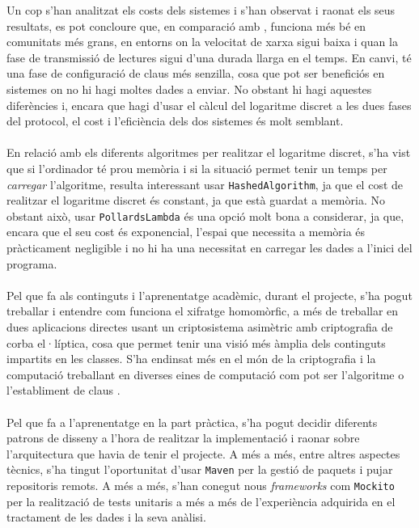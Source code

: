 
Un cop s'han analitzat els costs dels sistemes i s'han observat i raonat els seus resultats, es pot concloure que, en comparació amb \cite{busom}, \cite{recsi} funciona més bé en comunitats més grans, en entorns on la velocitat de xarxa sigui baixa i quan la fase de transmissió de lectures sigui d'una durada llarga en el temps. En canvi, \cite{busom} té una fase de configuració de claus més senzilla, cosa que pot ser beneficiós en sistemes on no hi hagi moltes dades a enviar. No obstant hi hagi aquestes diferències i, encara que \cite{recsi} hagi d'usar el càlcul del logaritme discret a les dues fases del protocol, el cost i l'eficiència dels dos sistemes és molt semblant.
\\
\\
En relació amb els diferents algoritmes per realitzar el logaritme discret, s'ha vist que si l'ordinador té prou memòria i si la situació permet tenir un temps per \textit{carregar} l'algoritme, resulta interessant usar \texttt{HashedAlgorithm}, ja que el cost de realitzar el logaritme discret és constant, ja que està guardat a memòria. No obstant això, usar \texttt{PollardsLambda} és una opció molt bona a considerar, ja que, encara que el seu cost és exponencial, l'espai que necessita a memòria és pràcticament negligible i no hi ha una necessitat en carregar les dades a l'inici del programa.
\\
\\
Pel que fa als continguts i l'aprenentatge acadèmic, durant el projecte, s'ha pogut treballar i entendre com funciona el xifratge homomòrfic, a més de treballar en dues aplicacions directes usant un criptosistema asimètric amb criptografia de corba el·líptica, cosa que permet tenir una visió més àmplia dels continguts impartits en les classes. S'ha endinsat més en el món de la criptografia i la computació treballant en diverses eines de computació com pot ser l'algoritme \cite{kangaroo} o l'establiment de claus \cite{diffie-hellman}.
\\
\\
Pel que fa a l'aprenentatge en la part pràctica, s'ha pogut decidir diferents patrons de disseny a l'hora de realitzar la implementació i raonar sobre l'arquitectura que havia de tenir el projecte. A més a més, entre altres aspectes tècnics, s'ha tingut l'oportunitat d'usar \texttt{Maven} per la gestió de paquets i pujar repositoris remots. A més a més, s'han conegut nous \textit{frameworks} com \texttt{Mockito} per la realització de tests unitaris a més a més de l'experiència adquirida en el tractament de les dades i la seva anàlisi.
